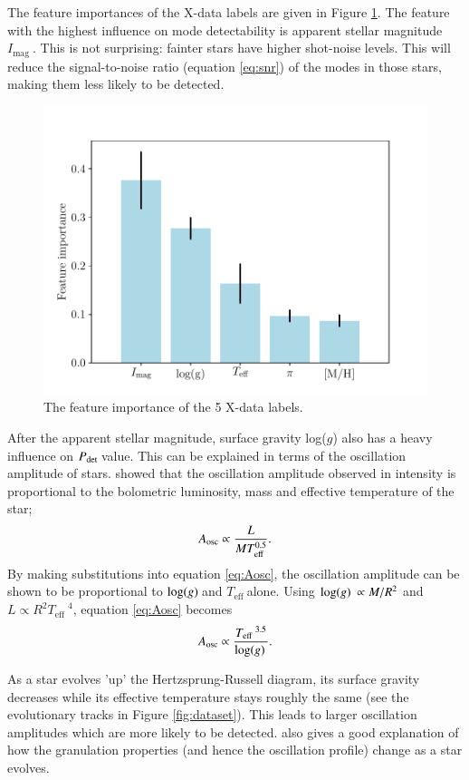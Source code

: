 \documentclass[a4paper,fleqn,usenatbib,useAMS]{mnras}
\newcommand{\teff}{\ensuremath{T_{\textrm{eff}}\:}}
\newcommand{\pdet}{\ensuremath{P_{\rm det}\:}}
\newcommand{\imag}{\ensuremath{I_{\textrm{mag}}\:}}
\newcommand{\logg}{\ensuremath{{\rm log}(g)\:}}
\begin{document}
The feature importances of the X-data labels are given in Figure \ref{fig:feature}. The feature with the highest influence on mode detectability is apparent stellar magnitude \imag. This is not surprising: fainter stars have higher shot-noise levels. This will reduce the signal-to-noise ratio (equation \ref{eq:snr}) of the modes in those stars, making them less likely to be detected.
\begin{figure}
	\centering
	\includegraphics[scale=0.5]{Plot1_featureimportance.pdf}
	\caption{The feature importance of the 5 X-data labels.}	
	\label{fig:feature}
\end{figure}

After the apparent stellar magnitude, surface gravity log($g$) also has a heavy influence on \pdet value. This can be explained in terms of the oscillation amplitude of stars. \citet{kjeldsen_amplitudes_1995} showed that the oscillation amplitude observed in intensity is proportional to the bolometric luminosity, mass and effective temperature of the star;
\begin{equation}
A_{\rm osc} \propto \frac{L}{MT_{\rm eff}^{0.5}}.
\label{eq:Aosc}
\end{equation}
By making substitutions into equation \ref{eq:Aosc}, the oscillation amplitude can be shown to be proportional to \logg and \teff alone. Using $\logg \propto M/R^{2}$ and $L \propto R^{2}\teff^{4}$, equation \ref{eq:Aosc} becomes
\begin{equation}
A_{\rm osc} \propto \frac{\teff^{3.5}}{\logg} .
\end{equation}

As a star evolves 'up' the Hertzsprung-Russell diagram, its surface gravity decreases while its effective temperature stays roughly the same (see the evolutionary tracks in Figure \ref{fig:dataset}). This leads to larger oscillation amplitudes which are more likely to be detected. \citet{mathur_granulation_2011} also gives a good explanation of how the granulation properties (and hence the oscillation profile) change as a star evolves. 
\end{document}
